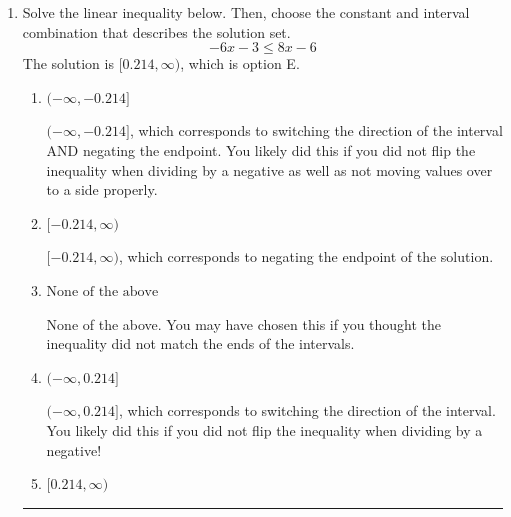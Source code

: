\documentclass{extbook}[14pt]
\newcommand{\litem}[1]{\item #1

\rule{\textwidth}{0.4pt}}
\begin{document}
\begin{enumerate}
{\begin{enumerate}[label=\Alph*.]
* $(-\infty, -4.0) \text{ or } (-2.0, \infty)$, which is the correct option.
\item \( (-\infty, 2.0] \text{ or } [4.0, \infty) \)

 $(-\infty, 2.0] \text{ or } [4.0, \infty)$, which corresponds to including the endpoints (when they should be excluded) and inverting the inequality and negating the solution.
\item \( (-\infty, \infty) \)

 $(-\infty, \infty)$, which corresponds to the variable canceling and does not happen in this instance.
\item \( (-\infty, -4.0] \text{ or } [-2.0, \infty) \)

 $(-\infty, -4.0] \text{ or } [-2.0, \infty)$, which corresponds to including the endpoints (when they should be excluded).
\item \( (-\infty, 2.0) \text{ or } (4.0, \infty) \)

 $(-\infty, 2.0) \text{ or } (4.0, \infty)$, which corresponds to inverting the inequality and negating the solution.
\end{enumerate}

\textbf{General Comment:} When multiplying or dividing by a negative, flip the sign.
}
\litem{
Solve the linear inequality below. Then, choose the constant and interval combination that describes the solution set.
\[ -6x -3 \leq 8x -6 \]The solution is \( [0.214, \infty) \), which is option E.\begin{enumerate}[label=\Alph*.]
\item \( (-\infty, -0.214] \)

 $(-\infty, -0.214]$, which corresponds to switching the direction of the interval AND negating the endpoint. You likely did this if you did not flip the inequality when dividing by a negative as well as not moving values over to a side properly.
\item \( [-0.214, \infty) \)

 $[-0.214, \infty)$, which corresponds to negating the endpoint of the solution.
\item \( \text{None of the above} \)

None of the above. You may have chosen this if you thought the inequality did not match the ends of the intervals.
\item \( (-\infty, 0.214] \)

 $(-\infty, 0.214]$, which corresponds to switching the direction of the interval. You likely did this if you did not flip the inequality when dividing by a negative!
\item \( [0.214, \infty) \)


\end{enumerate}}
\end{enumerate}
\end{document}

